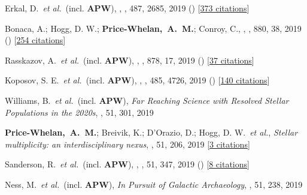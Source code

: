 \item[{\color{deemph}\scriptsize56}]Erkal, D.~\textit{et al.}~(incl. \textbf{APW}), , \mnras, 487, 2685, 2019 () [\href{http://adsabs.harvard.edu/abs/2019MNRAS.487.2685E}{373 citations}]

\item[{\color{deemph}\scriptsize55}]Bonaca, A.; Hogg, D. W.; \textbf{Price-Whelan,~A.~M.}; Conroy, C., , \apj, 880, 38, 2019 () [\href{http://adsabs.harvard.edu/abs/2019ApJ...880...38B}{254 citations}]

\item[{\color{deemph}\scriptsize54}]Rasskazov, A.~\textit{et al.}~(incl. \textbf{APW}), , \apj, 878, 17, 2019 () [\href{http://adsabs.harvard.edu/abs/2019ApJ...878...17R}{37 citations}]

\item[{\color{deemph}\scriptsize53}]Koposov, S. E.~\textit{et al.}~(incl. \textbf{APW}), , \mnras, 485, 4726, 2019 () [\href{http://adsabs.harvard.edu/abs/2019MNRAS.485.4726K}{140 citations}]

\item[{\color{deemph}\scriptsize52}]Williams, B.~\textit{et al.}~(incl. \textbf{APW}), \textit{Far Reaching Science with Resolved Stellar Populations in the 2020s}, \baas, 51, 301, 2019

\item[{\color{deemph}\scriptsize51}]\textbf{Price-Whelan,~A.~M.}; Breivik, K.; D'Orazio, D.; Hogg, D. W.~\textit{et al.}, \textit{Stellar multiplicity: an interdisciplinary nexus}, \baas, 51, 206, 2019 [\href{http://adsabs.harvard.edu/abs/2019BAAS...51c.206P}{3 citations}]

\item[{\color{deemph}\scriptsize50}]Sanderson, R.~\textit{et al.}~(incl. \textbf{APW}), , \baas, 51, 347, 2019 () [\href{http://adsabs.harvard.edu/abs/2019BAAS...51c.347S}{8 citations}]

\item[{\color{deemph}\scriptsize49}]Ness, M.~\textit{et al.}~(incl. \textbf{APW}), \textit{In Pursuit of Galactic Archaeology}, \baas, 51, 238, 2019

